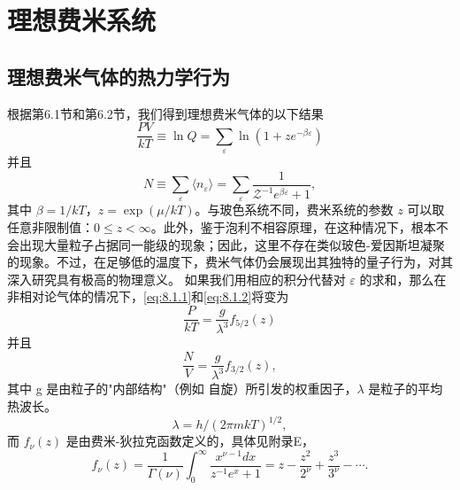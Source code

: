 ﻿\chapter{理想费米系统}\label{ux7406ux60f3ux8d39ux7c73ux7cfbux7edf}
\section{理想费米气体的热力学行为}\label{ux7406ux60f3ux8d39ux7c73ux6c14ux4f53ux7684ux70edux529bux5b66ux884cux4e3a}
根据第6.1节和第6.2节，我们得到理想费米气体的以下结果
\begin{equation}\tag{8.1.1}\label{eq:8.1.1}
\frac { P V } { k T } \equiv \ln Q = \sum _ { \varepsilon } \ln ( 1 + z e ^{- \beta \varepsilon} )
\end{equation}
并且
\begin{equation}\tag{8.1.2}\label{eq:8.1.2}
N \equiv \sum _ { \varepsilon } \langle n _ { \varepsilon } \rangle = \sum _ { \varepsilon } \frac { 1 } { \mathcal { Z } ^{- 1} e ^{\beta \varepsilon} + 1 } ,
\end{equation}
其中 \(\beta=1/kT\)，\(z=\exp(\mu/kT)\)。与玻色系统不同，费米系统的参数 \(z\) 可以取任意非限制值：\(0\leq z<\infty\)。此外，鉴于泡利不相容原理，在这种情况下，根本不会出现大量粒子占据同一能级的现象；因此，这里不存在类似玻色-爱因斯坦凝聚的现象。不过，在足够低的温度下，费米气体仍会展现出其独特的量子行为，对其深入研究具有极高的物理意义。
如果我们用相应的积分代替对 \(\varepsilon\) 的求和，那么在非相对论气体的情况下，\autoref{eq:8.1.1}和\autoref{eq:8.1.2}将变为
\begin{equation}\tag{8.1.3}\label{eq:8.1.3}
\frac { P } { k T } = \frac { g } { \lambda ^{3} } f _ { 5 / 2 } ( z )
\end{equation}
并且
\begin{equation}\tag{8.1.4}\label{eq:8.1.4}
\frac { N } { V } = \frac { g } { \lambda ^{3} } f _ { 3 / 2 } ( z ) ,
\end{equation}
其中 g 是由粒子的"内部结构"（例如 \(自旋\)）所引发的权重因子，\(\lambda\) 是粒子的平均热波长。
\begin{equation}\tag{8.1.5}\label{eq:8.1.5}
\lambda = h / ( 2 \pi m k T ) ^{1 / 2} ,
\end{equation}
而 \(f_{\nu}(z)\) 是由费米-狄拉克函数定义的，具体见附录E，
\begin{equation}\tag{8.1.6}\label{eq:8.1.6}
f _ { \nu } ( z ) = \frac { 1 } { \Gamma ( \nu ) } \int _ { 0 } ^{\infty} \frac { x ^{\nu - 1} d x } { z ^{- 1} e ^{x} + 1 } = z - \frac { z ^{2} } { 2 ^{\nu} } + \frac { z ^{3} } { 3 ^{\nu} } - \cdots .
\end{equation}
